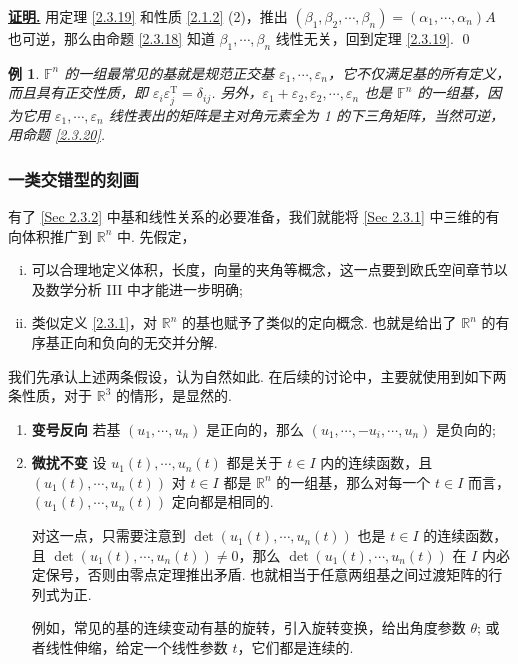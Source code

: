 \documentclass[10pt,openany]{article}
\theoremstyle{thmstyle} %
\theoremstyle{defstyle} %
\theoremstyle{prostyle} %
\theoremstyle{exastyle}
\newtheorem{example}[theorem]{例}
\theoremstyle{remstyle}
\renewenvironment{proof}[1][证明]{\par\underline{\textbf{#1.}} \;\fangsong}{\qed\par}
\newcommand{\T}{^{\text{T}}}
\newcommand{\F}{\mathbb{F}}
\newcommand{\R}{\mathbb{R}}
\begin{document}
\begin{proof}
	用定理 \ref{2.3.19} 和性质 \ref{2.1.2} (2)，推出 \( (\beta_1,\beta_2,\cdots,\beta_n)=(\alpha_1,\cdots,\alpha_n)A \) 也可逆，那么由命题 \ref{2.3.18} 知道 \( \beta_1,\cdots,\beta_n \) 线性无关，回到定理 \ref{2.3.19}.
\end{proof}

\begin{example}
	\( \F^n \) 的一组最常见的基就是规范正交基 \( \varepsilon_1,\cdots,\varepsilon_n \)，它不仅满足基的所有定义，而且具有正交性质，即 \( \varepsilon_i\varepsilon_j\T=\delta_{ij} \). 另外，\( \varepsilon_1+\varepsilon_2,\varepsilon_2, \cdots,\varepsilon_n \) 也是 \( \F^n \) 的一组基，因为它用 \( \varepsilon_1,\cdots,\varepsilon_n \) 线性表出的矩阵是主对角元素全为 1 的下三角矩阵，当然可逆，用命题 \ref{2.3.20}.
\end{example}

\subsubsection{一类交错型的刻画}

有了 \ref{Sec 2.3.2} 中基和线性关系的必要准备，我们就能将 \ref{Sec 2.3.1} 中三维的有向体积推广到 \( \R^n \) 中. 先假定，
\begin{enumerate}[(i)]
	\item 可以合理地定义体积，长度，向量的夹角等概念，这一点要到欧氏空间章节以及数学分析 III 中才能进一步明确;
	\item 类似定义 \ref{2.3.1}，对 \( \R^n \) 的基也赋予了类似的定向概念. 也就是给出了 \( \R^n \) 的有序基正向和负向的无交并分解.
\end{enumerate}

我们先承认上述两条假设，认为自然如此. 在后续的讨论中，主要就使用到如下两条性质，对于 \( \R^3 \) 的情形，是显然的.

\begin{enumerate}[(1)]
	\item \textbf{变号反向} \; 若基 \( (u_1,\cdots,u_n) \) 是正向的，那么 \( (u_1,\cdots,-u_i,\cdots,u_n) \) 是负向的;
	\item \textbf{微扰不变} \; 设 \( u_1(t),\cdots,u_n(t) \) 都是关于 \( t \in I \) 内的连续函数，且 \( (u_1(t),\cdots,u_n(t)) \) 对 \( t \in I \) 都是 \( \R^n \) 的一组基，那么对每一个 \( t \in I \) 而言，\( (u_1(t),\cdots,u_n(t)) \) 定向都是相同的. 
	
	对这一点，只需要注意到 \( \det(u_1(t),\cdots,u_n(t)) \) 也是 \( t \in I \) 的连续函数，且 \( \det(u_1(t),\cdots,u_n(t)) \neq 0 \)，那么 \( \det(u_1(t),\cdots,u_n(t)) \) 在 \( I \) 内必定保号，否则由零点定理推出矛盾. 也就相当于任意两组基之间过渡矩阵的行列式为正.
	
	例如，常见的基的连续变动有基的旋转，引入旋转变换，给出角度参数 \( \theta \); 或者线性伸缩，给定一个线性参数 \( t \)，它们都是连续的.
\end{enumerate}
\end{document}
